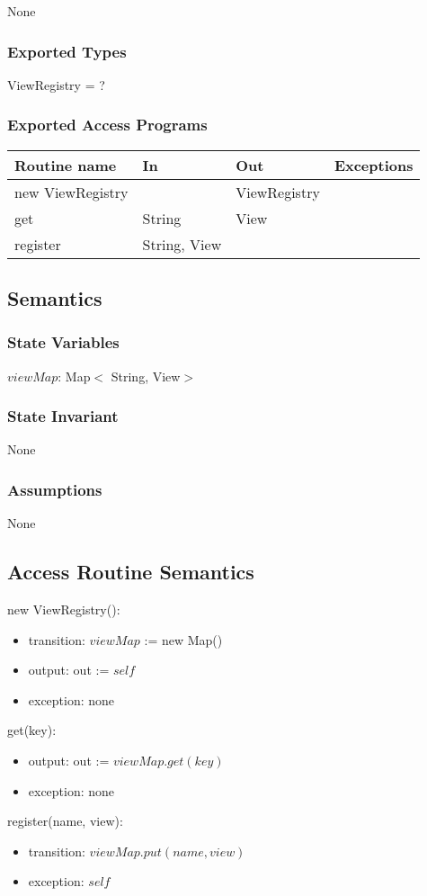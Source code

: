 \documentclass[12pt]{article}
\begin{document}
None

\subsubsection* {Exported Types}

ViewRegistry = ? 

\subsubsection* {Exported Access Programs}

\begin{tabular}{| l | l | l | p{6cm} |}
\hline
\textbf{Routine name} & \textbf{In} & \textbf{Out} & \textbf{Exceptions}\\
\hline
new ViewRegistry & & ViewRegistry & \\
\hline
get & String & View & \\
\hline
register &String, View &  & \\
\hline
\end{tabular}

\subsection* {Semantics}
\subsubsection* {State Variables}
$viewMap$: Map$<$ String, View$>$
\subsubsection* {State Invariant}
None

\subsubsection* {Assumptions}
None

\subsection* {Access Routine Semantics}
new ViewRegistry():
\begin{itemize}
\item transition: $viewMap$ := new Map()
\item output: out := $self$
\item exception: none
\end{itemize}
get(key):
\begin{itemize}
\item output: out := $viewMap.get(key)$
\item exception: none
\end{itemize}
register(name, view):
\begin{itemize}
\item transition: $viewMap.put(name, view)$
\item exception: $self$
\end{itemize}
\end{document}
